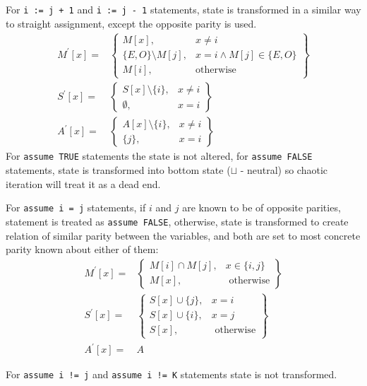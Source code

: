 For \texttt{i := j + 1} and \texttt{i := j - 1} statements, state is transformed in a similar way to straight assignment, except the opposite parity is used.
\begin{align*}
M^\prime[x] = & \left.
	\begin{cases}
		M[x], & x\ne i \\
		\{E, O\} \setminus M[j], & x = i \wedge M[j] \in \{E, O\} \\
		M[i], & \text{otherwise}
	\end{cases}
\right\}\\
S^\prime[x] = & \left.
	\begin{cases}
		S[x] \setminus \{i\}, & x\ne i \\
		\emptyset, & x = i 
	\end{cases}
\right\}\\
A^\prime[x] = & \left.
\begin{cases}
	A[x] \setminus \{i\}, & x\ne i \\
	\{j\}, & x = i
\end{cases}
\right\}
\end{align*}
For \texttt{assume TRUE} statements the state is not altered, for \texttt{assume FALSE} statements, state is transformed into bottom state ($\sqcup$ - neutral) so chaotic iteration will treat it as a dead end.

For \texttt{assume i = j} statements, if $i$ and $j$ are known to be of opposite parities, statement is treated as \texttt{assume FALSE}, otherwise, state is transformed to create relation of similar parity between the variables, and both are set to most concrete parity known about either of them:
\begin{align*}
M^\prime[x] = & \left.
	\begin{cases}
		M[i]\cap M[j], & x \in \{i,j\} \\
		M[x], & \text{ otherwise}
	\end{cases}
\right\}\\
S^\prime[x] = & \left.
\begin{cases}
	S[x] \cup \{j\}, & x = i \\
	S[x] \cup \{i\}, & x = j \\
	S[x], & \text{ otherwise}
\end{cases}
\right\}\\
A^\prime[x] = & A
\end{align*}

For \texttt{assume i != j} and \texttt{assume i != K} statements state is not transformed.

